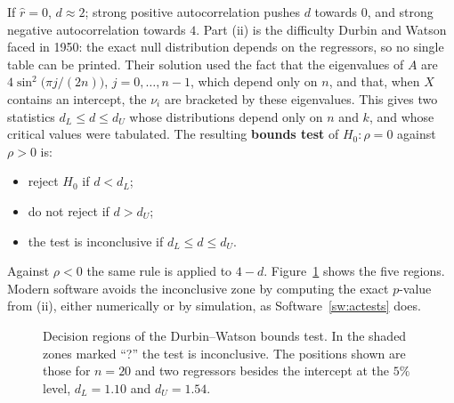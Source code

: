 \documentclass[11pt,a4paper]{article}
\numberwithin{equation}{section}
\theoremstyle{definition}
\begin{document}
If $\hat r = 0$, $d \approx 2$; strong positive autocorrelation pushes $d$ towards $0$, and strong negative autocorrelation towards $4$. Part (ii) is the
difficulty Durbin and Watson faced in 1950: the exact null distribution depends on the regressors, so no single table can be printed. Their solution
used the fact that the eigenvalues of $A$ are $4\sin^2\bigl(\pi j/(2n)\bigr)$, $j = 0, \dots, n - 1$, which depend only on $n$, and that, when $X$ contains an
intercept, the $\nu_i$ are bracketed by these eigenvalues. This gives two statistics $d_L \leq d \leq d_U$ whose distributions depend only on $n$ and $k$,
and whose critical values were tabulated. The resulting \textbf{bounds test} of $H_0\colon\rho = 0$ against $\rho > 0$ is:
\begin{itemize}
\item reject $H_0$ if $d < d_L$;
\item do not reject if $d > d_U$;
\item the test is inconclusive if $d_L \leq d \leq d_U$.
\end{itemize}
Against $\rho < 0$ the same rule is applied to $4 - d$. Figure~\ref{fig:dwregions} shows the five regions. Modern software avoids the inconclusive zone by
computing the exact $p$-value from (ii), either numerically or by simulation, as Software~\ref{sw:actests} does.

\begin{figure}[H]
\centering
{}
\caption{Decision regions of the Durbin--Watson bounds test. In the shaded zones marked ``?'' the test is inconclusive. The positions shown are those for
$n = 20$ and two regressors besides the intercept at the $5\%$ level, $d_L = 1.10$ and $d_U = 1.54$.}
\label{fig:dwregions}
\end{figure}
\end{document}
